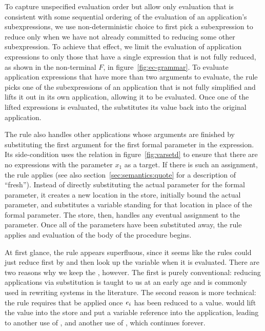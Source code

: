 To capture unspecified evaluation order but allow only evaluation that
is consistent with some sequential ordering of the evaluation of an
application's subexpressions, we use non-deterministic choice to first pick
a subexpression to reduce only when we have not already committed to
reducing some other subexpression. To achieve that effect, we limit
the evaluation of application expressions to only those that have a
single expression that is not fully reduced, as shown in the
non-terminal $F$, in figure~\ref{fig:ec-grammar}. To evaluate
application expressions that have more than two arguments to evaluate,
the rule  picks one of the subexpressions of an
application that is not fully simplified and lifts it out in its own
application, allowing it to be evaluated. Once one of the lifted
expressions is evaluated, the  substitutes its value
back into the original application.

The  rule also handles other applications whose
arguments are finished by substituting the first argument for
the first formal parameter in the expression. Its side-condition uses
the relation in figure~\ref{fig:varsetd} to ensure that there are no
 expressions with the parameter $x_1$ as a target.
If there is such an assignment, the  rule applies (see also section~\ref{sec:semantics:quote} for a description of ``fresh'').
Instead of directly substituting the actual parameter for the formal
parameter, it creates a new location in the store, initially bound the
actual parameter, and substitutes a variable standing for that
location in place of the formal parameter. The store, then, handles
any eventual assignment to the parameter. Once all of the parameters
have been substituted away, the rule  applies and
evaluation of the body of the procedure begins.

At first glance, the rule  appears superfluous, since it seems like the rules could just reduce first by  and then look up the variable when it is evaluated. 
There are two reasons why we keep the , however. 
The first is purely conventional: reducing applications via substitution is taught to us at an early age and is commonly used in rewriting systems in the literature.
The second reason is more technical:  the
 rule requires that  be applied once $\textnormal{\textit{e}}_i$ has been reduced to a value.  would
lift the value into the store and put a variable reference into the application, leading to another use of , and another use of , which continues forever.

